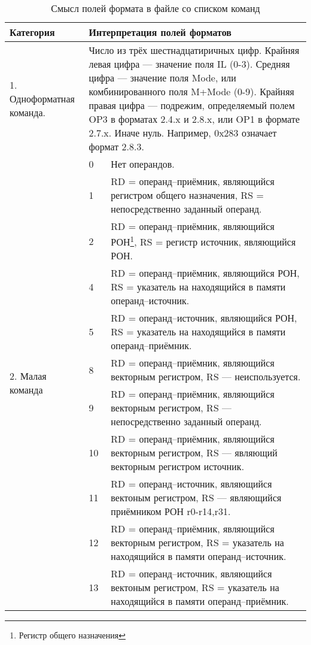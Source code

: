 \documentclass[forwardcom.tex]{subfiles}
\begin{document}
\pagebreak %
\label{table-format-field-in-list}
\begin{longtable} {|p{26mm}|p{16mm} p{100mm}|}
\caption{Смысл полей формата в файле со списком команд} \label{table:MeaningOfFormatsFieldInInstructionListFile}\\
\endfirsthead
\endhead
\hline
\bfseries Категория & \multicolumn{2}{|l|}{\bfseries Интерпретация полей форматов} \\
\hline
1.  Одноформатная команда. & \multicolumn{2}{|p{120mm}|}{
Число из трёх шестнадцатиричных цифр. Крайняя левая цифра --- значение поля IL (0-3). 
Средняя цифра --- значение поля Mode, или комбинированного поля M+Mode (0-9).
Крайняя правая цифра --- подрежим, определяемый полем OP3 в форматах 2.4.x и 2.8.x, или OP1 в формате 2.7.x. Иначе нуль. 
Например, 0x283 означает формат 2.8.3.
}  \\ \hline
\multirow{11}{*}{\parbox{26mm}{2. Малая команда}} 
&  0 & Нет операндов. \\
&  1 & RD = операнд--приёмник, являющийся регистром общего назначения, RS = непосредственно заданный операнд. \\
&  2 & RD = операнд--приёмник, являющийся РОН\footnote{Регистр общего назначения}, RS = регистр источник, являющийся РОН. \\
&  4 & RD = операнд--приёмник, являющийся РОН, RS = указатель на находящийся в памяти операнд--источник. \\
&  5 & RD = операнд--источник, являющийся РОН, RS = указатель на находящийся в памяти операнд--приёмник. \\
&  8 & RD = операнд--приёмник, являющийся векторным регистром, RS --- неиспользуется. \\
&  9 & RD = операнд--приёмник, являющийся векторным регистром, RS --- непосредственно заданный операнд. \\
& 10 & RD = операнд--приёмник, являющийся векторным регистром, RS --- являющий векторным регистром источник. \\
& 11 & RD = операнд--источник, являющийся вектоным регистром, RS --- являющийся приёмником РОН r0-r14,r31. \\
& 12 & RD = операнд--приёмник, являющийся векторным регистром, RS = указатель на находящийся в памяти операнд--источник. \\
& 13 & RD = операнд--источник, являющийся вектоным регистром, RS = указатель на находящийся в памяти операнд--приёмник. \\ \hline

\end{longtable}
\end{document}
